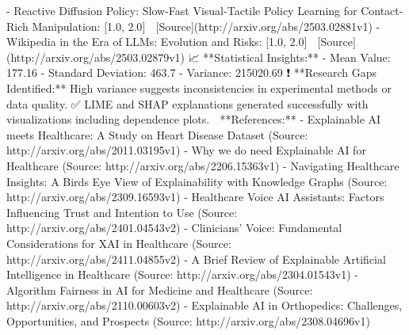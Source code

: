 \documentclass{article}%
\begin{document}
{-} Reactive Diffusion Policy: Slow{-}Fast Visual{-}Tactile Policy Learning for\newline%
  Contact{-}Rich Manipulation: {[}1.0, 2.0{]} 🔗 {[}Source{]}(http://arxiv.org/abs/2503.02881v1)\newline%
{-} Wikipedia in the Era of LLMs: Evolution and Risks: {[}1.0, 2.0{]} 🔗 {[}Source{]}(http://arxiv.org/abs/2503.02879v1)\newline%
\newline%
📈 **Statistical Insights:**\newline%
{-} Mean Value: 177.16\newline%
{-} Standard Deviation: 463.7\newline%
{-} Variance: 215020.69\newline%
\newline%
❗ **Research Gaps Identified:** High variance suggests inconsistencies in experimental methods or data quality.\newline%
✅ LIME and SHAP explanations generated successfully with visualizations including dependence plots.  \newline%
\newline%
📌 **References:**\newline%
{-} Explainable AI meets Healthcare: A Study on Heart Disease Dataset (Source: http://arxiv.org/abs/2011.03195v1)\newline%
{-} Why we do need Explainable AI for Healthcare (Source: http://arxiv.org/abs/2206.15363v1)\newline%
{-} Navigating Healthcare Insights: A Birds Eye View of Explainability with\newline%
  Knowledge Graphs (Source: http://arxiv.org/abs/2309.16593v1)\newline%
{-} Healthcare Voice AI Assistants: Factors Influencing Trust and Intention\newline%
  to Use (Source: http://arxiv.org/abs/2401.04543v2)\newline%
{-} Clinicians' Voice: Fundamental Considerations for XAI in Healthcare (Source: http://arxiv.org/abs/2411.04855v2)\newline%
{-} A Brief Review of Explainable Artificial Intelligence in Healthcare (Source: http://arxiv.org/abs/2304.01543v1)\newline%
{-} Algorithm Fairness in AI for Medicine and Healthcare (Source: http://arxiv.org/abs/2110.00603v2)\newline%
{-} Explainable AI in Orthopedics: Challenges, Opportunities, and Prospects (Source: http://arxiv.org/abs/2308.04696v1)\newline%
\end{document}

